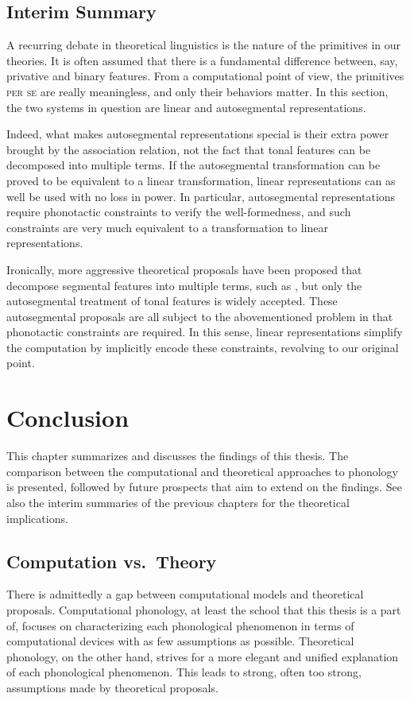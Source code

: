 \documentclass[12pt, a4paper]{report}
\newcommand{\textemph}[1]{\textsc{#1}}
\begin{document}
\section{Interim Summary}
A recurring debate in theoretical linguistics is the nature of the
primitives in our theories.  It is often assumed that there is a
fundamental difference between, say, privative and binary features.
From a computational point of view, the primitives \textemph{per se}
are really meaningless, and only their behaviors matter.  In this
section, the two systems in question are linear and autosegmental
representations.

Indeed, what makes autosegmental representations special is their
extra power brought by the association relation, not the fact that
tonal features can be decomposed into multiple terms.  If the
autosegmental transformation can be proved to be equivalent to a
linear transformation, linear representations can as well be used with
no loss in power.  In particular, autosegmental representations
require phonotactic constraints to verify the well-formedness, and
such constraints are very much equivalent to a transformation to
linear representations.

Ironically, more aggressive theoretical proposals have been proposed
that decompose segmental features into multiple terms, such as
\textcite{klv85ispetcg}, but only the autosegmental treatment of tonal
features is widely accepted.  These autosegmental proposals are all
subject to the abovementioned problem in that phonotactic constraints
are required.  In this sense, linear representations simplify the
computation by implicitly encode these constraints, revolving to our
original point.

\chapter{Conclusion}
This chapter summarizes and discusses the findings of this thesis.
The comparison between the computational and theoretical approaches to
phonology is presented, followed by future prospects that aim to
extend on the findings.  See also the interim summaries of the
previous chapters for the theoretical implications.

\section{Computation vs.\ Theory}
There is admittedly a gap between computational models and theoretical
proposals.  Computational phonology, at least the school that this
thesis is a part of, focuses on characterizing each phonological
phenomenon in terms of computational devices with as few assumptions
as possible.  Theoretical phonology, on the other hand, strives for a
more elegant and unified explanation of each phonological phenomenon.
This leads to strong, often too strong, assumptions made by
theoretical proposals.
\end{document}
